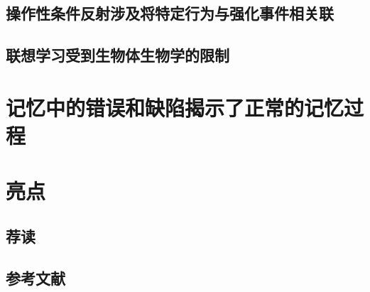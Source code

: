 \subsection{操作性条件反射涉及将特定行为与强化事件相关联}
\subsection{联想学习受到生物体生物学的限制}

\section{记忆中的错误和缺陷揭示了正常的记忆过程}

\section{亮点}
\subsection{荐读}
\subsection{参考文献}